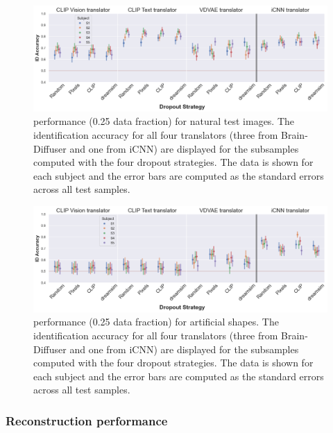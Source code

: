 \begin{figure}[ht]
  \centering
  \includegraphics[width=1\textwidth]{plots/dropout_eval_translator_test.png}
  \caption[Experiment 1: Translator performance for natural test images]{ performance (0.25 data fraction) for natural test images. The identification accuracy for all four translators (three from Brain-Diffuser and one from iCNN) are displayed for the subsamples computed with the four dropout strategies. The data is shown for each subject and the error bars are computed as the standard errors across all test samples.}\label{fig:dropout_eval_translator_test}
\end{figure}


\begin{figure}[ht]
  \centering
  \includegraphics[width=1\textwidth]{plots/dropout_eval_translator_art.png}
  \caption[Experiment 1: Translator performance for artificial shapes]{ performance (0.25 data fraction) for artificial shapes. The identification accuracy for all four translators (three from Brain-Diffuser and one from iCNN) are displayed for the subsamples computed with the four dropout strategies. The data is shown for each subject and the error bars are computed as the standard errors across all test samples.}\label{fig:dropout_eval_translator_art}
\end{figure}


\subsubsection{Reconstruction performance}

